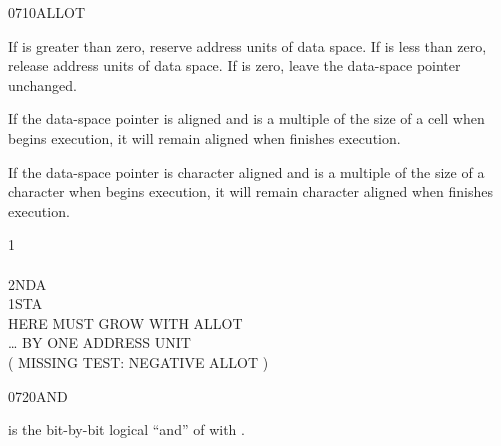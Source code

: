 \vspace*{-2.5ex}\enlargethispage{10ex}
\begin{worddef}{0710}{ALLOT}
\item {}

	If  is greater than zero, reserve  address units
	of data space. If  is less than zero, release 
	address units of data space. If  is zero, leave the
	data-space pointer unchanged.

	If the data-space pointer is aligned and  is a multiple
	of the size of a cell when  begins execution, it will
	remain aligned when  finishes execution.

	If the data-space pointer is character aligned and  is a
	multiple of the size of a character when  begins
	execution, it will remain character aligned when 
	finishes execution.


	\begin{testing} %
		\ttfamily
		 1  \\
		 \\
		 2NDA \\
		 1STA \\
		 \tab {} HERE MUST GROW WITH ALLOT \\
		 \tab {} {\ldots} BY ONE ADDRESS UNIT \\
		( MISSING TEST: NEGATIVE ALLOT )
	\end{testing}
\end{worddef}

\vspace*{-2.5ex}
\begin{worddef}{0720}{AND}
\item {}

	 is the bit-by-bit logical ``and'' of 
	with .

	\begin{testing} %
		 \\
		 \\
		 \\

		 \\

		 \\
		 \\
		 \\
	\end{testing}
\end{worddef}

